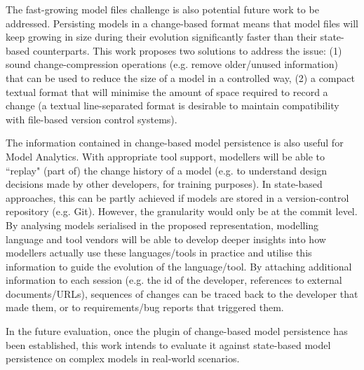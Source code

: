 The fast-growing model files challenge is also potential future work to be addressed. Persisting models in a change-based format means that model files will keep growing in size during their evolution significantly faster than their state-based counterparts. This work proposes two solutions to address the issue: (1) sound change-compression operations (e.g. remove older/unused information) that can be used to reduce the size of a model in a controlled way, (2) a compact textual format that will minimise the amount of space required to record a change (a textual line-separated format is desirable to maintain compatibility with file-based version control systems). 

The information contained in change-based model persistence is also useful for Model Analytics. With appropriate tool support, modellers will be able to ``replay" (part of) the change history of a model (e.g. to understand design decisions made by other developers, for training purposes). In state-based approaches, this can be partly achieved if models are stored in a version-control repository (e.g. Git). However, the granularity would only be at the commit level. By analysing models serialised in the proposed representation, modelling language and tool vendors will be able to develop deeper insights into how modellers actually use these languages/tools in practice and utilise this information to guide the evolution of the language/tool. By attaching additional information to each session (e.g. the id of the developer, references to external documents/URLs), sequences of changes can be traced back to the developer that made them, or to requirements/bug reports that triggered them.

In the future evaluation, once the plugin of change-based model persistence has been established, this work intends to evaluate it against state-based model persistence on complex models in real-world scenarios.


